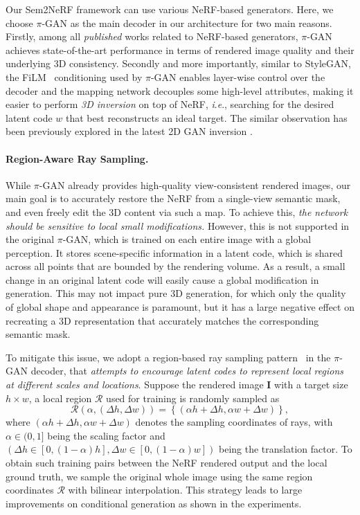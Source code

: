 \documentclass[runningheads]{llncs}
\newcommand{\ie}{\textit{i}.\textit{e}.}
\begin{document}
Our Sem2NeRF framework can use various NeRF-based generators. Here, we choose $\pi$-GAN as the main decoder in our architecture for two main reasons. Firstly, among all \emph{published} works related to NeRF-based generators, $\pi$-GAN achieves state-of-the-art performance in terms of rendered image quality and their underlying 3D consistency. Secondly and more importantly, similar to StyleGAN, the FiLM~\cite{perez2018film} conditioning used by $\pi$-GAN enables layer-wise control over the decoder and the mapping network decouples some high-level attributes, making it easier to perform \emph{3D inversion} on top of NeRF, \ie, searching for the desired latent code $w$ that best reconstructs an ideal target. The similar observation has been previously explored in the latest 2D GAN inversion \cite{collins2020editing,karras2020analyzing,richardson2021encoding}.

\paragraph{\textbf{Region-Aware Ray Sampling.}} While $\pi$-GAN already provides high-quality view-consistent rendered images, our main goal is to accurately restore the NeRF from a single-view semantic mask, and even freely edit the 3D content via such a map. To achieve this, \emph{the network should be sensitive to local small modifications.} However, this is not supported in the original $\pi$-GAN, which is trained on each entire image with a global perception. It stores scene-specific information in a latent code, which is shared across all points that are bounded by the rendering volume. As a result, a small change in an original latent code will easily cause a global modification in generation. This may not impact pure 3D generation, for which only the quality of global shape and appearance is paramount, but it has a large negative effect on recreating a 3D representation that accurately matches the corresponding semantic mask.



To mitigate this issue, we adopt a region-based ray sampling pattern~\cite{schwarz2020graf,liu2022semantic} in the $\pi$-GAN decoder, that \emph{attempts to encourage latent codes to represent local regions at different scales and locations}. Suppose the rendered image $\mathbf{I}$ with a target size $h\times w$, a local region $\mathcal{R}$ used for training is randomly sampled as
\begin{equation}
\mathcal{R}(\alpha, (\Delta h, \Delta w)) = \left \{ (\alpha h + \Delta h, \alpha w + \Delta w)  \right \},
\label{eq:ray_sample}
\end{equation}
where $(\alpha h + \Delta h, \alpha w + \Delta w)$ denotes the sampling coordinates of rays, with $\alpha \in (0, 1]$ being the scaling factor and $(\Delta h \in [0, (1 - \alpha)h], \Delta w \in [0, (1 - \alpha)w])$ being the translation factor. To obtain such training pairs between the NeRF rendered output and the local ground truth, we sample the original whole image using the same region coordinates $\mathcal{R}$ with bilinear interpolation. This strategy leads to large improvements on conditional generation as shown in the experiments.
\end{document}
